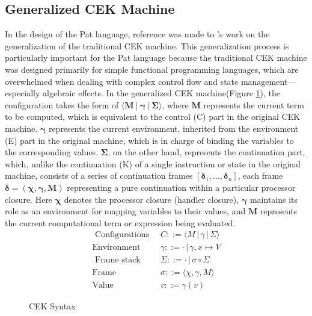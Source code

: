 \documentclass{l4proj}
\begin{document}
\subsection{Generalized CEK Machine}
In the design of the Pat language, reference was made to \cite{hillerstrm_2016_liberating}'s work on the generalization of the traditional CEK machine. This generalization process is particularly important for the Pat language because the traditional CEK machine was designed primarily for simple functional programming languages, which are overwhelmed when dealing with complex control flow and state management---especially algebraic effects. In the generalized CEK machine(Figure \ref{fig:equations}), the configuration takes the form of $\langle \boldsymbol{M}\: |\: \boldsymbol{\gamma} \:| \:\boldsymbol{\Sigma} \rangle$, where $\boldsymbol{M}$ represents the current term to be computed, which is equivalent to the control (C) part in the original CEK machine. $\boldsymbol{\gamma}$ represents the current environment, inherited from the environment (E) part in the original machine, which is in charge of binding the variables to the corresponding values. $\boldsymbol{\Sigma}$, on the other hand, represents the continuation part, which, unlike the continuation (K) of a single instruction or state in the original machine, consists of a series of continuation frames $[\boldsymbol{\delta}_1, \ldots , \boldsymbol{\delta}_n]$, each frame $\boldsymbol{\delta} = (\boldsymbol{\chi}, \boldsymbol{\gamma}, \boldsymbol{M})$ representing a pure continuation within a particular processor closure. Here $\boldsymbol{\chi}$ denotes the processor closure (handler closure), $\boldsymbol{\gamma}$ maintains its role as an environment for mapping variables to their values, and $\boldsymbol{M}$ represents the current computational term or expression being evaluated. 
\begin{align*}
\text{ Configurations}\;\; & C ::= \langle M \, | \, \gamma \, | \, \Sigma \rangle \\
\text{Environment}\;\; & \gamma ::= \cdot \, | \, \gamma, x \mapsto V \\
\text{ Frame stack}\;\; & \Sigma ::= \cdot \, | \, \sigma \circ \Sigma \\
\text{Frame}\;\; & \sigma ::= \langle \chi, \gamma, M \rangle \\
\text{Value}\;\; & v ::= \gamma(v) 
\end{align*}
\vspace{-2\baselineskip} 
\begin{figure}[ht]
    \caption{CEK Syntax}
    \label{fig:equations}
\end{figure}
\end{document}
